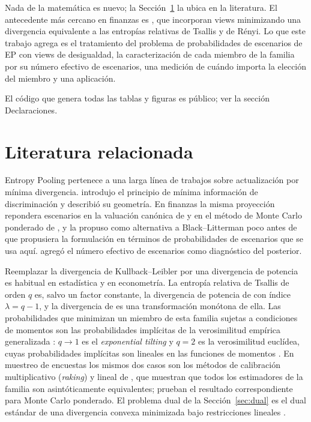 \documentclass[11pt]{article}
\begin{document}
Nada de la matem\'atica es nuevo; la Secci\'on~\ref{sec:literature} la ubica
en la literatura. El antecedente m\'as cercano en finanzas es
\citet{DeyJuneja2012}, que incorporan views minimizando una divergencia
equivalente a las entrop\'ias relativas de Tsallis y de R\'enyi. Lo que este
trabajo agrega es el tratamiento del problema de probabilidades de
escenarios de EP con views de desigualdad, la caracterizaci\'on de cada
miembro de la familia por su n\'umero efectivo de escenarios, una medici\'on
de cu\'ando importa la elecci\'on del miembro y una aplicaci\'on.

El c\'odigo que genera todas las tablas y figuras es p\'ublico; ver la secci\'on
Declaraciones.

\section{Literatura relacionada}\label{sec:literature}

Entropy Pooling pertenece a una larga l\'inea de trabajos sobre
actualizaci\'on por m\'inima divergencia. \citet{Kullback1959} introdujo el
principio de m\'inima informaci\'on de discriminaci\'on y \citet{Csiszar1975}
describi\'o su geometr\'ia. En finanzas la misma proyecci\'on repondera escenarios en
la valuaci\'on can\'onica de \citet{Stutzer1996} y en el m\'etodo de Monte Carlo
ponderado de \citet{AvellanedaEtAl2001}, y \citet{Pezier2007} la propuso
como alternativa a Black--Litterman poco antes de que \citet{Meucci2008}
propusiera la formulaci\'on en t\'erminos de probabilidades de escenarios que se usa
aqu\'i. \citet{Meucci2012} agreg\'o el n\'umero efectivo de escenarios como
diagn\'ostico del posterior.

Reemplazar la divergencia de Kullback--Leibler por una divergencia de
potencia es habitual en estad\'istica y en econometr\'ia. La entrop\'ia relativa
de Tsallis de orden $q$ es, salvo un factor constante, la divergencia de
potencia de \citet{CressieRead1984} con \'indice $\lambda = q-1$, y la
divergencia de \citet{Renyi1961} es una transformaci\'on mon\'otona de ella.
Las probabilidades que minimizan un miembro de esta familia sujetas a
condiciones de momentos son las probabilidades impl\'icitas de la
verosimilitud emp\'irica generalizada \citep{NeweySmith2004}: $q \to 1$ es el
\emph{exponential tilting}
\citep{KitamuraStutzer1997,ImbensSpadyJohnson1998} y $q=2$ es la
verosimilitud eucl\'idea, cuyas probabilidades impl\'icitas son lineales en
las funciones de momentos \citep{AntoineBonnalRenault2007}. En muestreo de
encuestas los mismos dos casos son los m\'etodos de calibraci\'on
multiplicativo (\emph{raking}) y lineal de \citet{DevilleSarndal1992}, que
muestran que todos los estimadores de la familia son asint\'oticamente
equivalentes; \citet{GlassermanYu2005} prueban el resultado correspondiente
para Monte Carlo ponderado. El problema dual de la Secci\'on~\ref{sec:dual}
es el dual est\'andar de una divergencia convexa minimizada bajo
restricciones lineales \citep{BorweinLewis1991}.
\end{document}
